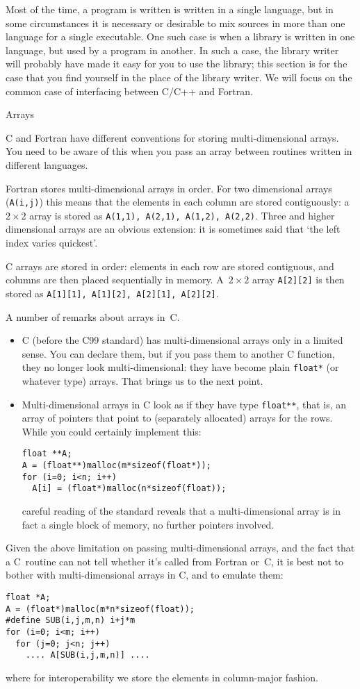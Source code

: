 Most of the time, a program is written is written in a single
language, but in some circumstances it is necessary or desirable to
mix sources in more than one language for a single executable. One
such case is when a library is written in one language, but used by a
program in another. In such a case, the library writer will probably
have made it easy for you to use the library; this section is for the
case that you find yourself in the place of the library writer. We
will focus on the common case of interfacing between C/C++ and
Fortran.

 {Arrays}
\label{sec:arrays}

C and Fortran have different conventions for storing multi-dimensional
arrays. You need to be aware of this when you pass an array between
routines written in different languages. 

Fortran stores multi-dimensional arrays in 
order. For two dimensional arrays (\texttt{A(i,j)}) this means that
the elements in each column are stored contiguously: a $2\times2$
array is stored as \texttt{A(1,1), A(2,1), A(1,2), A(2,2)}. Three and
higher dimensional arrays are an obvious extension: it is sometimes
said that `the left index varies quickest'.

C arrays are stored in  order: elements in each
row are stored contiguous, and columns are then placed sequentially in
memory. A~$2\times2$ array \texttt{A[2][2]} is then stored as
\texttt{A[1][1], A[1][2], A[2][1], A[2][2]}. 

A number of remarks about arrays in~C.
\begin{itemize}
\item C (before the C99 standard) has multi-dimensional arrays only in
  a limited sense. You can declare them, but if you pass them to another
  C function, they no longer look multi-dimensional: they have become
  plain \texttt{float*} (or whatever type) arrays. That brings us to
  the next point.
\item Multi-dimensional arrays in C look as if they have type
  \texttt{float**}, that is, an array of pointers that point to
  (separately allocated) arrays for the rows. While you could
  certainly implement this:
\begin{verbatim}
float **A;
A = (float**)malloc(m*sizeof(float*));
for (i=0; i<n; i++)
  A[i] = (float*)malloc(n*sizeof(float));
\end{verbatim}
  careful reading of the standard reveals that a multi-dimensional
  array is in fact a single block of memory, no further pointers
  involved.
\end{itemize}
Given the above limitation on passing multi-dimensional arrays, and
the fact that a C~routine can not tell whether it's called from
Fortran or~C, it is best not to bother with multi-dimensional arrays
in C, and to emulate them:
\begin{verbatim}
float *A;
A = (float*)malloc(m*n*sizeof(float));
#define SUB(i,j,m,n) i+j*m
for (i=0; i<m; i++)
  for (j=0; j<n; j++)
    .... A[SUB(i,j,m,n)] ....
\end{verbatim}
where for interoperability we store the elements in column-major fashion.

